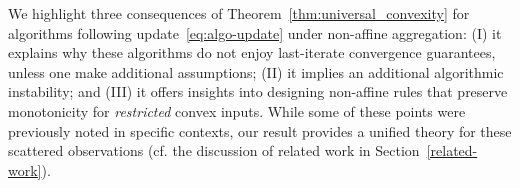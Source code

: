 \documentclass[twoside,11pt]{article}
\newcommand\mc{\mathcal}
\let\todo\relax%
\newcommand{\comm}[3][inline]{\todo[#1, size=\tiny]{#2: #3}}
\newcommand{\tbtodo}[2][inline]{\comm[color=orange,#1]{TB}{#2}}
\newcommand{\autodo}[2][inline]{\comm[color=green,#1]{AB}{#2}}
\newcommand{\ngtodo}[2][inline]{\comm[color=blue!60!white,#1]{NG}{\color{white} #2}}
\begin{document}
We highlight three consequences of Theorem~\ref{thm:universal_convexity} for algorithms following update~\eqref{eq:algo-update} under non-affine aggregation: 
(I) it explains why these algorithms do not enjoy last-iterate convergence guarantees, unless one make additional assumptions;
(II) it implies an additional algorithmic instability; and 
(III) it offers insights into designing non-affine rules that preserve monotonicity for \emph{restricted} convex inputs.
While some of these points were previously noted in specific contexts, our result provides a unified theory for these scattered observations (cf. the discussion of related work in Section~\ref{related-work}).
\end{document}
